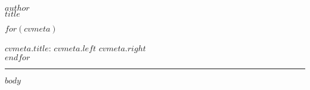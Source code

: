 \documentclass[10pt,A4]{article}
\newcommand{\metasection}[2]
{
\footnotesize{#2} \hspace*{\fill} \footnotesize{#1}\\[1pt]
}
\newcommand{\mystrut}{\rule[-.3\baselineskip]{0pt}{\baselineskip}}
\begin{document}
\pagestyle{fancy}

\vspace{-8pt}
\begin{center}
	\HUGE \textsc{$author$} \\[2pt]
	\small $title$
\end{center}

\vspace{6pt}

$for(cvmeta)$
\metasection{$cvmeta.right$}{\textbf{$cvmeta.title$}: $cvmeta.left$}
$endfor$

\vspace{-2pt}
\textcolor{softcol}{\hrule}
\vspace{6pt}

\normalsize

\vspace{-6pt}
$body$


\null
\vspace*{\fill}
\hspace{-0.25\linewidth}\colorbox{white}{\makebox[1.5\linewidth][c]{\mystrut  \textnormal{\textcolor{sectcol}{$cvfooter.left$}    \textcolor{sectcol}{$cvfooter.right$}}}}
\end{document}
